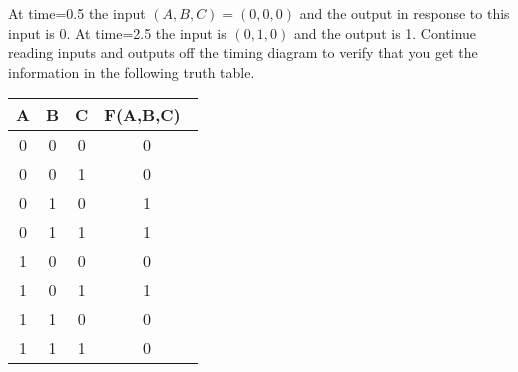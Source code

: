 At time=0.5 the input $(A,B,C)=(0,0,0)$ and the output in response to this input is 0.  
At time=2.5 the input is $(0,1,0)$ and the output is 1.  
Continue reading inputs and outputs off the timing diagram to verify
that you get the information in the following truth table.

\begin{tabular}{c|c|c||c}
A & B & C & F(A,B,C)\ \\ \hline
0 & 0 & 0  & 0  \\ \hline
0 & 0 & 1  & 0  \\ \hline
0 & 1 & 0  & 1  \\ \hline
0 & 1 & 1  & 1  \\ \hline
1 & 0 & 0  & 0  \\ \hline
1 & 0 & 1  & 1  \\ \hline
1 & 1 & 0  & 0  \\ \hline
1 & 1 & 1  & 0  \\ 
\end{tabular}



